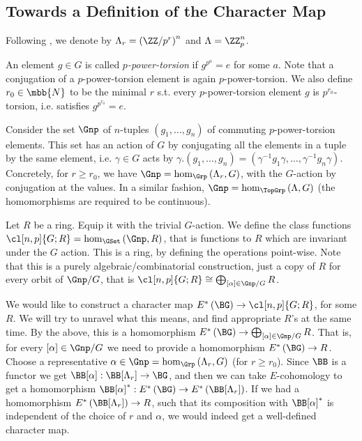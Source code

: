 


\subsection{Towards a Definition of the Character Map}

Following \cite{HKR}, we denote by $\Lambda_r = \left(\ZZ/{p^r}\right)^n$ and $\Lambda = \ZZ_p^n$.

An element $g \in G$ is called \emph{$p$-power-torsion} if $g^{p^a} = e$ for some $a$.
Note that a conjugation of a $p$-power-torsion element is again $p$-power-torsion.
We also define $r_0 \in \mbb{N}$ to be the minimal $r$ s.t. every $p$-power-torsion element $g$ is $p^{r_0}$-torsion, i.e. satisfies $g^{p^{r_0}} = e$.

Consider the set $\Gnp$ of $n$-tuples $\left(g_1, \dotsc, g_n\right)$ of commuting $p$-power-torsion elements.
This set has an action of $G$ by conjugating all the elements in a tuple by the same element, i.e. $\gamma \in G$ acts by $\gamma. \left(g_1, \dotsc, g_n\right) = \left(\gamma^{-1} g_1 \gamma, \dotsc, \gamma^{-1} g_n \gamma\right)$.
Concretely, for $r \geq r_0$, we have $\Gnp = \hom_{\Grp}\left(\Lambda_r, G\right)$, with the $G$-action by conjugation at the values.
In a similar fashion, $\Gnp = \hom_{\TopGrp}\left(\Lambda, G\right)$ (the homomorphisms are required to be continuous).

Let $R$ be a ring.
Equip it with the trivial $G$-action.
We define the class functions $\cl[n,p]{G; R} = \hom_{\GSet}\left(\Gnp, R\right)$, that is functions to $R$ which are invariant under the $G$ action.
This is a ring, by defining the operations point-wise.
Note that this is a purely algebraic/combinatorial construction, just a copy of $R$ for every orbit of $\Gnp/G$, that is $\cl[n,p]{G; R} \cong \bigoplus_{\left[\alpha\right] \in \Gnp/G} R$.

We would like to construct a character map $E^*\left(\BG\right) \to \cl[n,p]{G; R}$, for some $R$.
We will try to unravel what this means, and find appropriate $R$'s at the same time.
By the above, this is a homomorphism $E^*\left(\BG\right) \to \bigoplus_{\left[\alpha\right] \in \Gnp/G} R$.
That is, for every $\left[\alpha\right] \in \Gnp/G$ we need to provide a homomorphism $E^*\left(\BG\right) \to R$.
Choose a representative $\alpha \in \Gnp = \hom_{\Grp}\left(\Lambda_r, G\right)$ (for $r \geq r_0$).
Since $\BB$ is a functor we get $\BB[\alpha]: \BB[\Lambda_r] \to \BG$, and then we can take $E$-cohomology to get a homomorphism $\BB[\alpha]^*: E^*\left(\BG\right) \to E^*\left(\BB[\Lambda_r]\right)$.
If we had a homomorphism $E^*\left(\BB[\Lambda_r]\right) \to R$, such that its composition with $\BB[\alpha]^*$ is independent of the choice of $r$ and $\alpha$, we would indeed get a well-defined character map.



